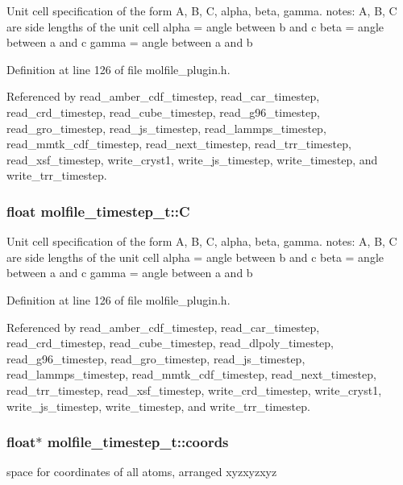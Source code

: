 Unit cell specification of the form A, B, C, alpha, beta, gamma. notes: A, B, C are side lengths of the unit cell alpha = angle between b and c beta = angle between a and c gamma = angle between a and b 

Definition at line 126 of file molfile\_\-plugin.h.

Referenced by read\_\-amber\_\-cdf\_\-timestep, read\_\-car\_\-timestep, read\_\-crd\_\-timestep, read\_\-cube\_\-timestep, read\_\-g96\_\-timestep, read\_\-gro\_\-timestep, read\_\-js\_\-timestep, read\_\-lammps\_\-timestep, read\_\-mmtk\_\-cdf\_\-timestep, read\_\-next\_\-timestep, read\_\-trr\_\-timestep, read\_\-xsf\_\-timestep, write\_\-cryst1, write\_\-js\_\-timestep, write\_\-timestep, and write\_\-trr\_\-timestep.
\subsubsection{\setlength{\rightskip}{0pt plus 5cm}float molfile\_\-timestep\_\-t::C}\label{structmolfile__timestep__t_z4_2}


Unit cell specification of the form A, B, C, alpha, beta, gamma. notes: A, B, C are side lengths of the unit cell alpha = angle between b and c beta = angle between a and c gamma = angle between a and b 

Definition at line 126 of file molfile\_\-plugin.h.

Referenced by read\_\-amber\_\-cdf\_\-timestep, read\_\-car\_\-timestep, read\_\-crd\_\-timestep, read\_\-cube\_\-timestep, read\_\-dlpoly\_\-timestep, read\_\-g96\_\-timestep, read\_\-gro\_\-timestep, read\_\-js\_\-timestep, read\_\-lammps\_\-timestep, read\_\-mmtk\_\-cdf\_\-timestep, read\_\-next\_\-timestep, read\_\-trr\_\-timestep, read\_\-xsf\_\-timestep, write\_\-crd\_\-timestep, write\_\-cryst1, write\_\-js\_\-timestep, write\_\-timestep, and write\_\-trr\_\-timestep.
\subsubsection{\setlength{\rightskip}{0pt plus 5cm}float$\ast$ molfile\_\-timestep\_\-t::coords}\label{structmolfile__timestep__t_m0}


space for coordinates of all atoms, arranged xyzxyzxyz 

